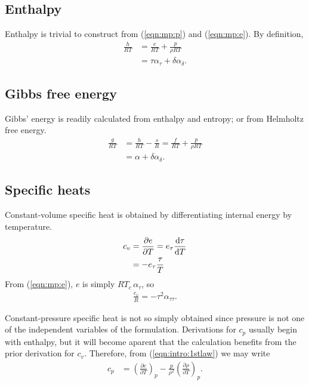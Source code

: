 \subsection{Enthalpy}\label{sec:mp1:h}

Enthalpy is trivial to construct from (\ref{eqn:mp:p}) and (\ref{eqn:mp:e}).  By definition, 
\begin{align}
\frac{h}{R T} &= \frac{e}{RT} + \frac{p}{\rho R T}\nonumber\\
 &= \tau \alpha_\tau + \delta \alpha_\delta.\label{eqn:mp:h}
\end{align}

\subsection{Gibbs free energy}\label{sec:mp1:g}

Gibbs' energy is readily calculated from enthalpy and entropy; or from Helmholtz free energy.
\begin{align}
\frac{g}{R T} &= \frac{h}{RT} - \frac{s}{R} = \frac{f}{RT} + \frac{p}{\rho RT}\nonumber\\
&= \alpha + \delta \alpha_\delta.
\end{align}

\subsection{Specific heats}\label{sec:mp1:c}

Constant-volume specific heat is obtained by differentiating internal energy by temperature.
\begin{align*}
c_v &= \frac{\partial e}{\partial T} = e_\tau \frac{\mathrm{d} \tau}{\mathrm{d} T}\\
 &= -e_\tau \frac{\tau}{T}
\end{align*}
From (\ref{eqn:mp:e}), $e$ is simply $R T_c \, \alpha_\tau$, so
\begin{align}
\frac{c_v}{R} = - \tau^2 \alpha_{\tau\tau}\label{eqn:mp:cv}.
\end{align}

Constant-pressure specific heat is not so simply obtained since pressure is not one of the independent variables of the formulation.  Derivations for $c_p$ usually begin with enthalpy, but it will become aparent that the calculation benefits from the prior derivation for $c_v$.  Therefore, from (\ref{eqn:intro:1stlaw}) we may write
\begin{align*}
c_p &= \left(\frac{\partial e}{\partial T}\right)_p - \frac{p}{\rho^2} \left(\frac{\partial \rho}{\partial T}\right)_p.
\end{align*}

